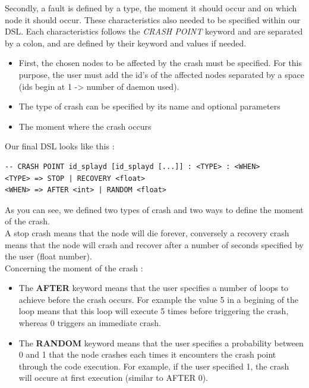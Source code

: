 \documentclass{eplmastersthesis}
\begin{document}
          Secondly, a fault is defined by a type, the moment it should occur and
          on which node it should occur. These characteristics also needed to
          be specified within our DSL. Each characteristics follows the
          \textit{CRASH POINT} keyword and are separated by a colon, and are
          defined by their keyword and values if needed.

          \begin{itemize}
            \item First, the chosen nodes to be affected by the crash must be
            specified. For this purpose, the user must add the id's of the
            affected nodes separated by a space (ids begin at 1 -> number of
            daemon used).
            \item The type of crash can be specified by its name and optional
            parameters
            \item The moment where the crash occurs
          \end{itemize}

          Our final DSL looks like this :

          \begin{lstlisting}[style=MyBash]
-- CRASH POINT id_splayd [id_splayd [...]] : <TYPE> : <WHEN>
<TYPE> => STOP | RECOVERY <float>
<WHEN> => AFTER <int> | RANDOM <float>
          \end{lstlisting}

          As you can see, we defined two types of crash and two ways to define
          the moment of the crash.\\
          A stop crash means that the node will die forever, conversely a
          recovery crash means that the node will crash and recover after a
          number of seconds specified by the user (float number).\\
          Concerning the moment of the crash :
          \begin{itemize}
            \item The \textbf{AFTER} keyword means that the user specifies a
            number of loops to achieve before the crash occurs. For example
            the value 5 in a begining of the loop means that this loop will
            execute 5 times before triggering the crash, whereas 0 triggers
            an immediate crash.
            \item The \textbf{RANDOM} keyword means that the user specifies a
            probability between 0 and 1 that the node crashes each times it
            encounters the crash point through the code execution. For example,
            if the user specified 1, the crash will occure at first execution
            (similar to AFTER 0).
          \end{itemize}
\end{document}
